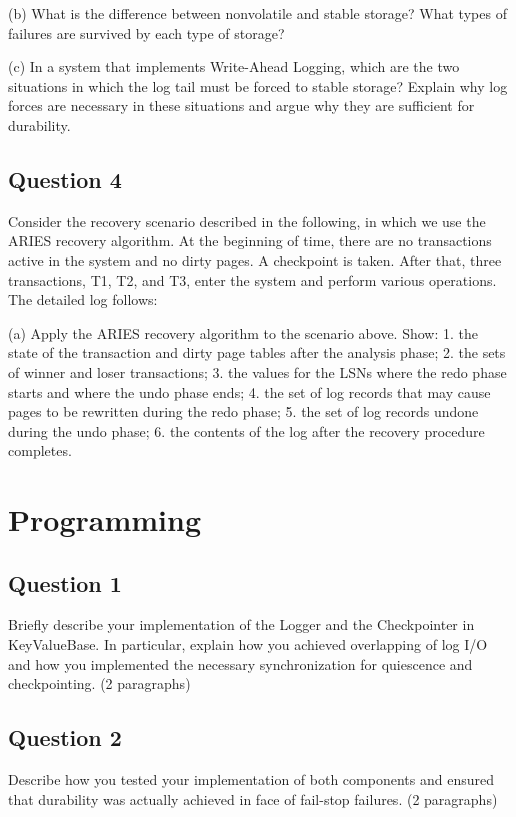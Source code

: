 \documentclass[12pt,a4paper]{article}
\begin{document}
(b) What is the difference between nonvolatile and stable storage? What types of failures are
survived by each type of storage?

(c) In a system that implements Write-Ahead Logging, which are the two situations in which the log
tail must be forced to stable storage? Explain why log forces are necessary in these situations and
argue why they are sufficient for durability.


\subsection*{Question 4}
\label{sec:eq4}

Consider the recovery scenario described in the following, in which we use the
ARIES recovery algorithm. At the beginning of time, there are no transactions active in the system and no
dirty pages. A checkpoint is taken. After that, three transactions, T1, T2, and T3, enter the system and
perform various operations. The detailed log follows:

(a) Apply the ARIES recovery algorithm to the scenario above. Show:
1. the state of the transaction and dirty page tables after the analysis phase;
2. the sets of winner and loser transactions;
3. the values for the LSNs where the redo phase starts and where the undo phase ends;
4. the set of log records that may cause pages to be rewritten during the redo phase;
5. the set of log records undone during the undo phase;
6. the contents of the log after the recovery procedure completes.


\section*{Programming} 
\label{sec:programming}

\subsection*{Question 1}
\label{sec:pq1}

Briefly describe your implementation of the Logger and the Checkpointer in
KeyValueBase. In particular, explain how you achieved overlapping of log I/O and how you
implemented the necessary synchronization for quiescence and checkpointing. (2 paragraphs)


\subsection*{Question 2}
\label{sec:pq2}
Describe how you tested your implementation of both components and ensured that
durability was actually achieved in face of fail-stop failures. (2 paragraphs)
\end{document}
